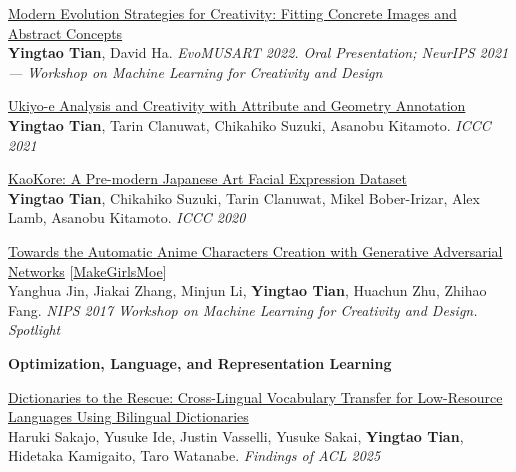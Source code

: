 \documentclass[line,margin]{cv}
\begin{document}
\begin{resume}
{  \begin{samepage}
  \href{https://arxiv.org/abs/2109.08857}{Modern Evolution Strategies for Creativity: Fitting Concrete Images and Abstract Concepts}\\
  \textbf{Yingtao Tian}, David Ha. \emph{EvoMUSART 2022. Oral Presentation; NeurIPS 2021 --- Workshop on Machine Learning for Creativity and Design}
  \par\end{samepage}

  \begin{samepage}
  \href{https://arxiv.org/abs/2106.02267}{Ukiyo-e Analysis and Creativity with Attribute and Geometry Annotation}\\
  \textbf{Yingtao Tian}, Tarin Clanuwat, Chikahiko Suzuki, Asanobu Kitamoto. \emph{ICCC 2021}
  \par\end{samepage}

  \begin{samepage}
  \href{https://arxiv.org/abs/2002.08595}{KaoKore: A Pre-modern Japanese Art Facial Expression Dataset}\\
  \textbf{Yingtao Tian}, Chikahiko Suzuki, Tarin Clanuwat, Mikel Bober-Irizar, Alex Lamb, Asanobu Kitamoto. \emph{ICCC 2020}
  \par\end{samepage}
  \begin{samepage}
  \href{https://arxiv.org/abs/1708.05509}{Towards the Automatic Anime Characters Creation with Generative Adversarial Networks} [\href{http://make.girls.moe/}{MakeGirlsMoe}]\\
  Yanghua Jin, Jiakai Zhang, Minjun Li, \textbf{Yingtao Tian}, Huachun Zhu, Zhihao Fang. \emph{NIPS 2017 Workshop on Machine Learning for Creativity and Design. Spotlight}
  \par\end{samepage}
}

\textbf{Optimization, Language, and Representation Learning}

{\small
\setlength{\parskip}{0.5ex plus 0.1ex minus 0.1ex}

  \begin{samepage}
  \href{https://aclanthology.org/2025.findings-acl.1333/}{Dictionaries to the Rescue: Cross-Lingual Vocabulary Transfer for Low-Resource Languages Using Bilingual Dictionaries}\\
  Haruki Sakajo, Yusuke Ide, Justin Vasselli, Yusuke Sakai, \textbf{Yingtao Tian}, Hidetaka Kamigaito, Taro Watanabe. \emph{Findings of ACL 2025}
  \par\end{samepage}

}
\end{resume}
\end{document}
